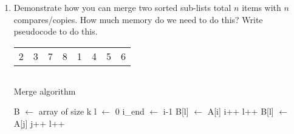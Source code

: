 \documentclass[12pt]{report}
\begin{document}
\begin{enumerate}[label=\arabic*.]
    \item Demonstrate how you can merge two sorted sub-lists total $n$ items with $n$ compares/copies. How much memory do we need to do this? Write pseudocode to do this.
	\begin{table}[H]
	    \centering
	    \begin{threeparttable}
			\label{tab:merge-sort-numbers}
			\begin{tabular}{p{0.075\textwidth}p{}p{}p{}p{0.075\textwidth}p{}p{}p{}}	 2 & 3 & 7 & 8 & 1 & 4 & 5 & 6 \\
			\end{tabular}
		\end{threeparttable}
	\end{table}
	\begin{table}[H]
	    \centering
	    \begin{threeparttable}
			\label{tab:merge-sort}
			\begin{tabular}{|p{0.075\textwidth}|p{}|p{}|p{}|p{}|p{}|p{}|p{}|}
				\toprule
				 &  &  &  &  &  &  &  \\
				\bottomrule
			\end{tabular}
		\end{threeparttable}
	\end{table}

	\begin{algorithm}[H]
		\caption{Merge algorithm}\label{alg:merge}
		\begin{algorithmic}[1]
			\State B $\gets$ array of size k
			\State l $\gets$ 0
			\State i\_end $\gets$ i-1
					\State B[l] $\gets$ A[i]
					\State i++
					\State l++
				\Else
					\State B[l] $\gets$ A[j]
					\State j++
					\State l++
				\EndIf
			\EndWhile\label{alg:merge-while}	%
		\EndFunction
		\end{algorithmic}
	\end{algorithm}



\end{enumerate}
\end{document}

